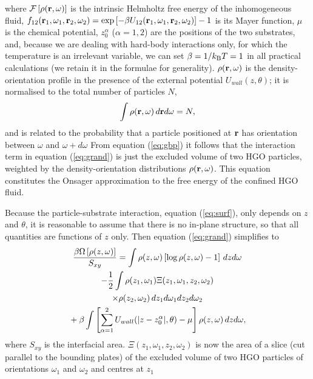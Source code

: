 \documentclass[aps,pre,twocolumn,groupedaddress,showpacs]{revtex4}
\begin{document}
where ${\cal F}\left[\rho({\bf r},\omega)\right]$ is the intrinsic
Helmholtz free energy of the inhomogeneous fluid, $f_{12}({\bf 
r}_1,\omega_1,{\bf r}_2,\omega_2)=\exp\left[-\beta U_{12}({\bf
r}_1,\omega_1,{\bf r}_2,\omega_2)\right]-1$ is its Mayer function, 
$\mu$ is the chemical potential, $z_0^{\alpha}$ ($\alpha=1,2$) are the 
positions of the two substrates, and, because we are dealing with hard-body
interactions only, for which the temperature is an irrelevant variable, we
can set $\beta=1/k_{\rm B}T=1$ in all practical calculations (we retain it
in the formulae for generality). $\rho({\bf r},\omega)$ is the
density-orientation profile in the presence of the external potential
$U_{wall}(z,\theta)$; it is normalised 
to the total number of particles $N$,
\begin{equation}
\label{eq:rhonorm}
\int \rho({\bf r},\omega)\,d{\bf r}d\omega = N,
\end{equation}
and is related to the probability that a particle positioned at 
${\bf r}$ has orientation between $\omega$ and $\omega+d\omega$
From equation (\ref{eq:gbp}) it follows
that the interaction term in equation (\ref{eq:grand}) is just the
excluded volume of two HGO particles, weighted by the density-orientation
distributions $\rho({\bf r},\omega)$. This equation constitutes the
Onsager approximation to the free energy of the confined HGO fluid.
\par
Because the particle-substrate interaction, equation (\ref{eq:surf}), 
only depends on $z$ and $\theta$, it is reasonable to assume that there 
is no in-plane structure, so that all quantities are functions of $z$ only. 
Then equation (\ref{eq:grand}) simplifies to 
\begin{multline}
\label{eq:grandz}
{{\beta\Omega\left[\rho(z,\omega)\right]}\over{S_{xy}}}=
\int \rho(z,\omega)\left[\log \rho(z,\omega) -1\right]\,dz 
d\omega\\
-{1\over 2}\int\rho(z_1,\omega_1)
\Xi(z_1,\omega_1,z_2,\omega_2)\\
\times\rho(z_2,\omega_2)\,dz_1 d\omega_1 dz_2 d\omega_2
\\
\mbox{}+\beta\int \left[\sum_{\alpha=1}^2
U_{wall}(|z-z_0^{\alpha}|,\theta)
-\mu\right]\rho(z,\omega)\,dz d\omega,
\end{multline}
where $S_{xy}$ is the interfacial area. 
$\Xi(z_1,\omega_1,z_2,\omega_2)$ is now the area of a slice
(cut parallel to the bounding plates) of the excluded volume of two HGO
particles of orientations $\omega_1$ and $\omega_2$ and centres at $z_1$
\end{document}
